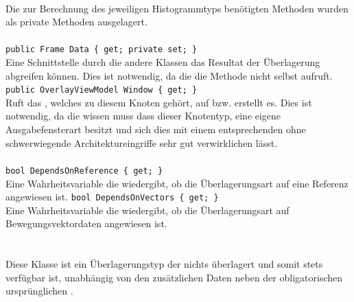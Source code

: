 \paragraph{}
\begin{itemize}
	\change Die zur Berechnung des jeweiligen Histogrammtyps benötigten Methoden wurden als private Methoden ausgelagert.
\end{itemize}

\paragraph{}
\begin{itemize}
	\add \verb!public Frame Data { get; private set; }! \\
	Eine Schnittstelle durch die andere Klassen das Resultat der Überlagerung abgreifen können. Dies ist notwendig, da die  die  Methode nicht selbst aufruft.
	\add \verb!public OverlayViewModel Window { get; }! \\
	Ruft das , welches zu diesem Knoten gehört, auf bzw. erstellt es. Dies ist notwendig, da die  wissen muss dass dieser Knotentyp, eine eigene Ausgabefensterart besitzt und sich dies mit einem entsprechenden  ohne schwerwiegende Architektureingriffe sehr gut verwirklichen lässt.
\end{itemize}

\paragraph{}
\begin{itemize}
	\add \verb!bool DependsOnReference { get; }! \\
	Eine Wahrheitsvariable die wiedergibt, ob die Überlagerungsart auf eine Referenz angewiesen ist.
	\add \verb!bool DependsOnVectors { get; }! \\
	Eine Wahrheitsvariable die wiedergibt, ob die Überlagerungsart auf Bewegungsvektordaten angewiesen ist.
\end{itemize}

\paragraph{}~\\
Diese Klasse ist ein Überlagerungstyp der nichts überlagert und somit stets verfügbar ist, unabhängig von den zusätzlichen Daten neben der obligatorischen ursprünglichen .
\newpage

